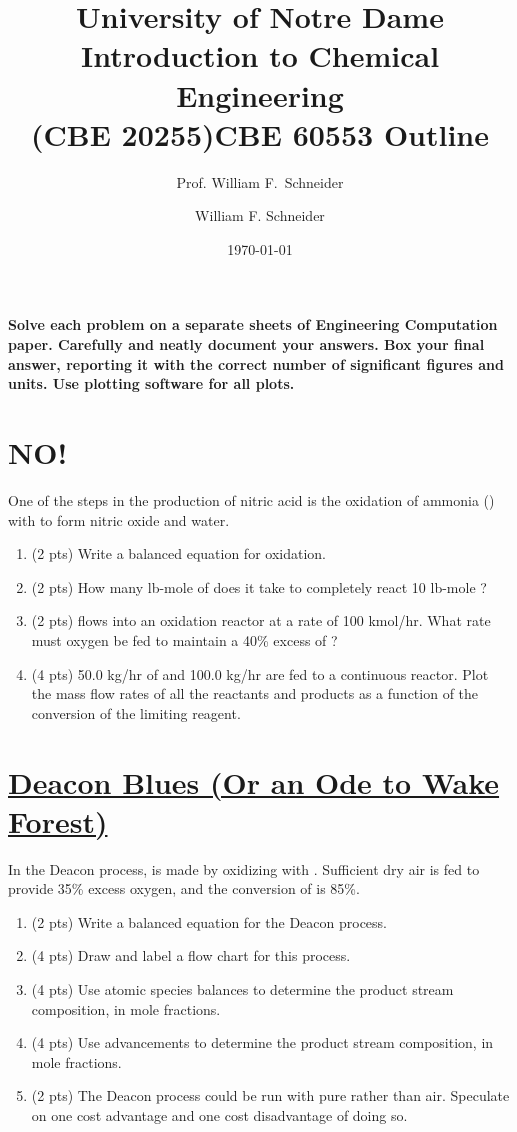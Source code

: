 \documentclass[11pt]{article}
\title{University of Notre Dame\\Introduction to Chemical Engineering\\(CBE 20255)}
\author{Prof. William F.\ Schneider}
\author{William F. Schneider}
\date{\today}
\title{CBE 60553 Outline}
\begin{document}
\begin{options}
\end{options}

\noindent \textbf{Solve each problem on a separate sheets of Engineering Computation paper.  Carefully and neatly document your answers. Box your final answer, reporting it with the correct number of significant figures and units.  Use plotting software for all plots.}


\section{NO!}
\label{sec-1}
One of the steps in the production of nitric acid is the oxidation of ammonia () with  to form nitric oxide and water.

\begin{enumerate}
\item (2 pts) Write a balanced equation for  oxidation.
\item (2 pts) How many lb-mole of  does it take to completely react 10 lb-mole ?
\item (2 pts)  flows into an oxidation reactor at a rate of 100 kmol/hr.  What rate must oxygen be fed to maintain a 40\% excess of ?
\item (4 pts) 50.0 kg/hr of  and 100.0 kg/hr  are fed to a continuous reactor.  Plot the mass flow rates of all the reactants and products as a function of the conversion of the limiting reagent.
\end{enumerate}

\section{\href{https://www.youtube.com/watch?v=yykSHeVXD8I}{Deacon Blues (Or an Ode to Wake Forest)}}
\label{sec-2}
In the Deacon process,  is made by oxidizing  with .  Sufficient dry air is fed to provide 35\% excess oxygen, and the conversion of  is 85\%.
\begin{enumerate}
\item (2 pts) Write a balanced equation for the Deacon process.
\item (4 pts) Draw and label a flow chart for this process.
\item (4 pts) Use atomic species balances to determine the product stream composition, in mole fractions.
\item (4 pts) Use advancements to determine the product stream composition, in mole fractions.
\item (2 pts) The Deacon process could be run with pure  rather than air.  Speculate on one cost advantage and one cost disadvantage of doing so.
\end{enumerate}
\end{document}
